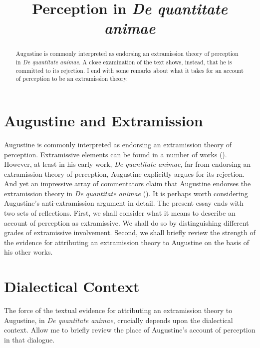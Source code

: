 \documentclass[12pt]{article}
\title{Perception in \emph{De quantitate animae}}
\author{\myauthor}
\date{} %
\begin{document}
\maketitle
\begin{abstract}
	\noindent Augustine is commonly interpreted as endorsing an extramission theory of perception in \emph{De quantitate animae}. A close examination of the text shows, instead, that he is committed to its rejection. I end with some remarks about what it takes for an account of perception to be an extramission theory.
\end{abstract}

\setlength{\parindent}{1em}


\section{Augustine and Extramission} %
\label{sec:augustine_and_extramission}

Augustine is commonly interpreted as endorsing an extramission theory of perception. Extramissive elements can be found in a number of works (). However, at least in his early work, \emph{De quantitate animae}, far from endorsing an extramission theory of perception, Augustine explicitly argues for its rejection. And yet an impressive array of commentators claim that Augustine endorses the extramission theory in \emph{De quantitate animae} (). It is perhaps worth considering Augustine's anti-extramission argument in detail. The present essay ends with two sets of reflections. First, we shall consider what it means to describe an account of perception as extramissive. We shall do so by distinguishing different grades of extramissive involvement. Second, we shall briefly review the strength of the evidence for attributing an extramission theory to Augustine on the basis of his other works.


\section{Dialectical Context} %
\label{sec:dialectical_context}

The force of the textual evidence for attributing an extramission theory to Augustine, in \emph{De quantitate animae}, crucially depends upon the dialectical context. Allow me to briefly review the place of Augustine's account of perception in that dialogue.
\end{document}
